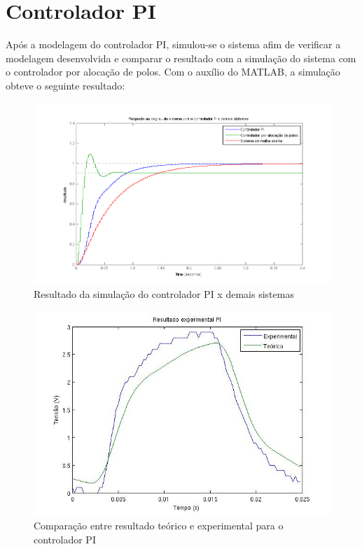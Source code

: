\documentclass[
oneside,					%
a4paper,					%
english,					%
brazil,					%
]{abntex2}
\begin{document}
\section{Controlador PI}

Após a modelagem do controlador PI, simulou-se o sistema afim de verificar a modelagem desenvolvida e comparar o resultado com a simulação do sistema com o controlador por alocação de polos. Com o auxílio do MATLAB, a simulação obteve o seguinte resultado: 

\begin{figure}[H]
	\centering
	\includegraphics[scale = 0.7]{controladorPISimulacao.png}
	\caption{Resultado da simulação do controlador PI x demais sistemas}
\end{figure}

\begin{figure}[H]
	\centering
	\includegraphics[scale = 0.7]{Resposta_PI.jpg}
	\caption{Comparação entre resultado teórico e experimental para o controlador PI}
\end{figure}
\end{document}
